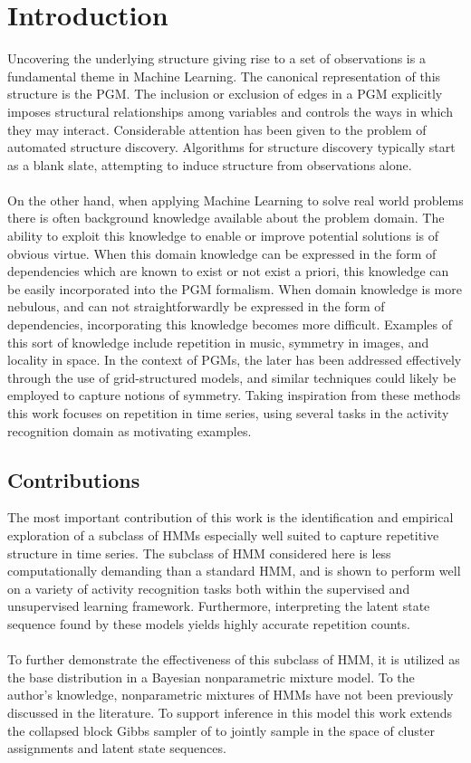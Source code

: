 \documentclass[12pt]{report}
\newcommand{\1}[0]{\mathbbm{1}}
\begin{document}
\chapter{Introduction}
Uncovering the underlying structure giving rise to a set of observations is a
fundamental theme in Machine Learning. The canonical representation of this structure
is the \ac{PGM}. The inclusion or exclusion of edges in a \ac{PGM} explicitly imposes
structural relationships among variables and controls the ways in which they may interact.
Considerable attention has been given to the problem of automated structure discovery.
Algorithms for structure discovery typically start as a blank slate, attempting to induce structure
from observations alone.
\\\\
On the other hand, when applying Machine Learning to solve real world problems there is
often background knowledge available about the problem domain. The ability to exploit
this knowledge to enable or improve potential solutions is of obvious virtue.
When this domain knowledge can be expressed in the form of dependencies which are known to exist
or not exist a priori, this knowledge can be easily incorporated into the \ac{PGM} formalism.
When domain knowledge is more nebulous, and can not straightforwardly be expressed in the form
of dependencies, incorporating this knowledge becomes more difficult. Examples of this sort of
knowledge include repetition in music, symmetry in images, and locality in space.
In the context of \acp{PGM}, the later has been addressed effectively through the use of
grid-structured models, and similar techniques could likely be employed to capture notions
of symmetry. Taking inspiration from these methods this work focuses on repetition
in time series, using several tasks in the activity recognition domain as motivating examples.

\section{Contributions}
The most important contribution of this work is the identification and empirical exploration of
a subclass of \acp{HMM} especially well suited to capture repetitive structure in time series.
The subclass of \ac{HMM} considered here is less computationally demanding than a standard \ac{HMM},
and is shown to perform well on a variety of activity recognition tasks both within the supervised
and unsupervised learning framework. Furthermore, interpreting the latent state sequence
found by these models yields highly accurate repetition counts.
\\\\
To further demonstrate the effectiveness of this subclass of \ac{HMM}, it is utilized as
the base distribution in a Bayesian nonparametric mixture model. To the author's knowledge,
nonparametric mixtures of \acp{HMM} have not been previously discussed in the literature.
To support inference in this model this work extends the collapsed block Gibbs sampler
of \cite{pcfg-bayesian-johnson} to jointly sample in the space of cluster assignments and
latent state sequences.
\end{document}
